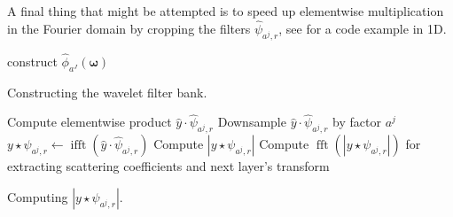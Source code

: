 \documentclass[twocolumn, openany, oneside, article]{memoir}
\DeclareMathOperator{\ifft}{ifft}
\DeclareMathOperator{\fft}{fft}
\begin{document}
A final thing that might be attempted is to speed up elementwise multiplication
in the Fourier domain by cropping the filters $\hat{\psi}_{a^j, r}$, see \cite{ifftmultiply}
for a code example in 1D.

\begin{algorithm}
construct $\hat{\phi}_{a^J}(\bm{\omega})$\;
\caption{Constructing the wavelet filter bank.}\label{algorithm:filterbank}
\end{algorithm}

\begin{algorithm}
  Compute elementwise product $\hat{y} \cdot \hat{\psi}_{a^j, r}$\;
  Downsample $\hat{y} \cdot \hat{\psi}_{a^j, r}$ by factor $a^j$\;
  $y \star \psi_{a^j, r} \leftarrow \ifft(\hat{y} \cdot \hat{\psi}_{a^j, r})$\;
  Compute $|y \star \psi_{a^j, r}|$\;
  Compute $\fft(|y \star \psi_{a^j, r}|)$ for extracting scattering coefficients and next layer's transform\;
  \caption{Computing $|y \star \psi_{a^j, r}|$.}\label{algorithm:scattering_operator}
\end{algorithm}






\printbibliography
\end{document}
